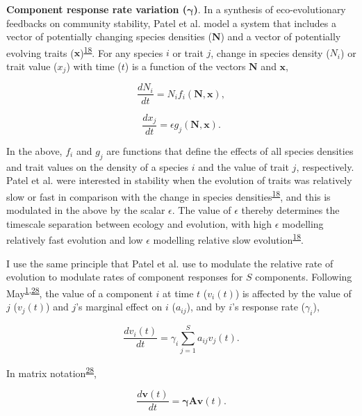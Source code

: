 \documentclass[]{article}
\begin{document}
\textbf{Component response rate variation (\(\mathbf{\gamma}\))}. In a
synthesis of eco-evolutionary feedbacks on community stability, Patel et
al. model a system that includes a vector of potentially changing
species densities (\(\mathbf{N}\)) and a vector of potentially evolving
traits
(\(\mathbf{x}\))\textsuperscript{\protect\hyperlink{ref-Patel2018}{18}}.
For any species \(i\) or trait \(j\), change in species density
(\(N_{i}\)) or trait value (\(x_{j}\)) with time (\(t\)) is a function
of the vectors \(\mathbf{N}\) and \(\mathbf{x}\),

\[\frac{dN_{i}}{dt} = N_{i}f_{i}(\mathbf{N}, \mathbf{x}),\]

\[\frac{dx_{j}}{dt} = \epsilon g_{j}(\mathbf{N}, \mathbf{x}).\]

In the above, \(f_{i}\) and \(g_{j}\) are functions that define the
effects of all species densities and trait values on the density of a
species \(i\) and the value of trait \(j\), respectively. Patel et al.
were interested in stability when the evolution of traits was relatively
slow or fast in comparison with the change in species
densities\textsuperscript{\protect\hyperlink{ref-Patel2018}{18}}, and
this is modulated in the above by the scalar \(\epsilon\). The value of
\(\epsilon\) thereby determines the timescale separation between ecology
and evolution, with high \(\epsilon\) modelling relatively fast
evolution and low \(\epsilon\) modelling relative slow
evolution\textsuperscript{\protect\hyperlink{ref-Patel2018}{18}}.

I use the same principle that Patel et al. use to modulate the relative
rate of evolution to modulate rates of component responses for \(S\)
components. Following
May\textsuperscript{\protect\hyperlink{ref-May1972}{1},\protect\hyperlink{ref-May1973}{28}},
the value of a component \(i\) at time \(t\) (\(v_{i}(t)\)) is affected
by the value of \(j\) (\(v_{j}(t)\)) and \(j\)'s marginal effect on
\(i\) (\(a_{ij}\)), and by \(i\)'s response rate (\(\gamma_{i}\)),

\[\frac{dv_{i}(t)}{dt} = \gamma_{i} \sum_{j=1}^{S}a_{ij}v_{j}(t).\]

In matrix notation\textsuperscript{\protect\hyperlink{ref-May1973}{28}},

\[\frac{d\mathbf{v}(t)}{dt} = \mathbf{\gamma} \mathbf{A}\mathbf{v}(t).\]
\end{document}
